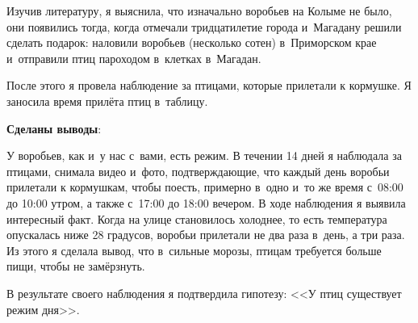 Изучив литературу, я выяснила, что изначально воробьев на Колыме не было, они появились тогда, когда отмечали тридцатилетие города и~Магадану решили сделать подарок: наловили воробьев (несколько сотен) в~Приморском крае и~отправили птиц пароходом в~клетках в~Магадан.

После этого я провела наблюдение за птицами, которые прилетали к кормушке. Я заносила время прилёта птиц в~таблицу.

\textbf{Сделаны выводы}:

У воробьев, как и~у нас с~вами, есть режим. В течении 14 дней я наблюдала за птицами, снимала видео и~фото, подтверждающие, что каждый день воробьи прилетали к кормушкам, чтобы поесть, примерно в~одно и~то же время с~08:00 до 10:00 утром, а также с~17:00 до 18:00 вечером. В ходе наблюдения я выявила интересный факт. Когда на улице становилось холоднее, то есть температура опускалась ниже 28 градусов, воробьи прилетали не два раза в~день, а три раза. Из этого я сделала вывод, что в~сильные морозы, птицам требуется больше пищи, чтобы не замёрзнуть.

В результате своего наблюдения я подтвердила гипотезу: <<У птиц существует режим дня>>.
